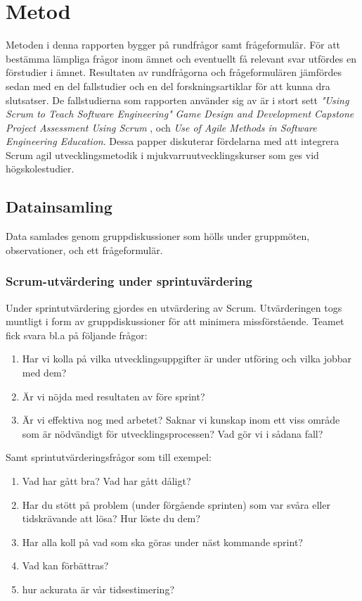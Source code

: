 \section{Metod} \label{sec:Lieth_Wahid-method}
Metoden i denna rapporten bygger på rundfrågor samt frågeformulär. För att bestämma lämpliga frågor inom ämnet och eventuellt få relevant svar utfördes en förstudier i ämnet. Resultaten av rundfrågorna och frågeformulären 
jämfördes sedan med en del fallstudier och en del forskningsartiklar för att kunna dra slutsatser. De fallstudierna som rapporten använder sig av är i stort sett  \textit{"Using Scrum to Teach Software Engineering"} \cite{Usingscr27:online} \textit{ Game Design and Development Capstone Project Assessment Using Scrum} \cite{ASEEPEER95:online} , och \textit{Use of Agile Methods in Software Engineering Education}\cite{UseofAgi59:online}. Dessa papper diskuterar fördelarna med att integrera Scrum agil utvecklingsmetodik i mjukvarruutvecklingskurser som ges vid högskolestudier.  
\subsection{Datainsamling}\label{ds}
Data samlades genom gruppdiskussioner som hölls under gruppmöten, observationer, och ett frågeformulär. 
\subsubsection {Scrum-utvärdering under sprintuvärdering } \label{Lieth:scrumU}
Under sprintutvärdering gjordes en utvärdering av Scrum. Utvärderingen togs muntligt i form av gruppdiskussioner för att minimera missförstående. Teamet fick svara bl.a på följande frågor:
\begin{enumerate}
	\item Har vi kolla på vilka utvecklingsuppgifter är under utföring och vilka jobbar med dem?
	\item Är vi nöjda med resultaten av före sprint? 
	\item Är vi effektiva nog med arbetet? Saknar vi kunskap inom ett viss område som är nödvändigt för utvecklingsprocessen? Vad gör vi i sådana fall? \label{f3}
\end{enumerate} 
Samt sprintutvärderingsfrågor som till exempel: 
\begin{enumerate}
	\item Vad har gått bra? Vad har gått dåligt?
	\item Har du stött på problem (under förgående sprinten) som var svåra eller tidskrävande att lösa? Hur löste du dem?
	\item Har alla koll på vad som ska göras under näst kommande sprint?
	\item Vad kan förbättras?
	\item hur ackurata är vår tidsestimering?
\end{enumerate} 

